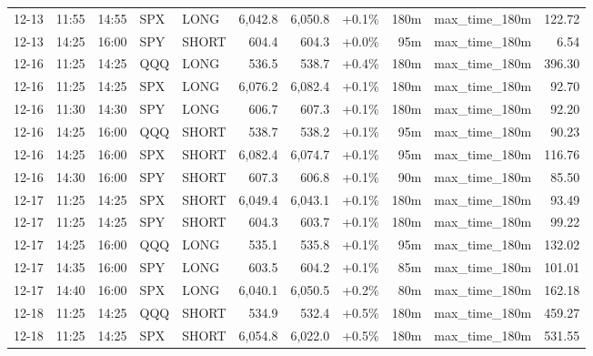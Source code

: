 \documentclass[11pt,a4paper,twoside]{article}
\begin{document}
\begin{center}
\begin{longtable}{>{\color{txtmain}}l l l l l r r r r >{\color{txtmain}}l r}
12-13 & 11:55 & 14:55 & SPX & LONG & 6,042.8 & 6,050.8 & \textcolor{wingreen}{+0.1\%} & 180m & max\_time\_180m & \textcolor{wingreen}{122.72} \\
12-13 & 14:25 & 16:00 & SPY & SHORT & 604.4 & 604.3 & \textcolor{wingreen}{+0.0\%} & 95m & max\_time\_180m & \textcolor{wingreen}{6.54} \\
12-16 & 11:25 & 14:25 & QQQ & LONG & 536.5 & 538.7 & \textcolor{wingreen}{+0.4\%} & 180m & max\_time\_180m & \textcolor{wingreen}{396.30} \\
12-16 & 11:25 & 14:25 & SPX & LONG & 6,076.2 & 6,082.4 & \textcolor{wingreen}{+0.1\%} & 180m & max\_time\_180m & \textcolor{wingreen}{92.70} \\
12-16 & 11:30 & 14:30 & SPY & LONG & 606.7 & 607.3 & \textcolor{wingreen}{+0.1\%} & 180m & max\_time\_180m & \textcolor{wingreen}{92.20} \\
12-16 & 14:25 & 16:00 & QQQ & SHORT & 538.7 & 538.2 & \textcolor{wingreen}{+0.1\%} & 95m & max\_time\_180m & \textcolor{wingreen}{90.23} \\
12-16 & 14:25 & 16:00 & SPX & SHORT & 6,082.4 & 6,074.7 & \textcolor{wingreen}{+0.1\%} & 95m & max\_time\_180m & \textcolor{wingreen}{116.76} \\
12-16 & 14:30 & 16:00 & SPY & SHORT & 607.3 & 606.8 & \textcolor{wingreen}{+0.1\%} & 90m & max\_time\_180m & \textcolor{wingreen}{85.50} \\
12-17 & 11:25 & 14:25 & SPX & SHORT & 6,049.4 & 6,043.1 & \textcolor{wingreen}{+0.1\%} & 180m & max\_time\_180m & \textcolor{wingreen}{93.49} \\
12-17 & 11:25 & 14:25 & SPY & SHORT & 604.3 & 603.7 & \textcolor{wingreen}{+0.1\%} & 180m & max\_time\_180m & \textcolor{wingreen}{99.22} \\
12-17 & 14:25 & 16:00 & QQQ & LONG & 535.1 & 535.8 & \textcolor{wingreen}{+0.1\%} & 95m & max\_time\_180m & \textcolor{wingreen}{132.02} \\
12-17 & 14:35 & 16:00 & SPY & LONG & 603.5 & 604.2 & \textcolor{wingreen}{+0.1\%} & 85m & max\_time\_180m & \textcolor{wingreen}{101.01} \\
12-17 & 14:40 & 16:00 & SPX & LONG & 6,040.1 & 6,050.5 & \textcolor{wingreen}{+0.2\%} & 80m & max\_time\_180m & \textcolor{wingreen}{162.18} \\
12-18 & 11:25 & 14:25 & QQQ & SHORT & 534.9 & 532.4 & \textcolor{wingreen}{+0.5\%} & 180m & max\_time\_180m & \textcolor{wingreen}{459.27} \\
12-18 & 11:25 & 14:25 & SPX & SHORT & 6,054.8 & 6,022.0 & \textcolor{wingreen}{+0.5\%} & 180m & max\_time\_180m & \textcolor{wingreen}{531.55} \\

\end{longtable}
\end{center}
\end{document}

